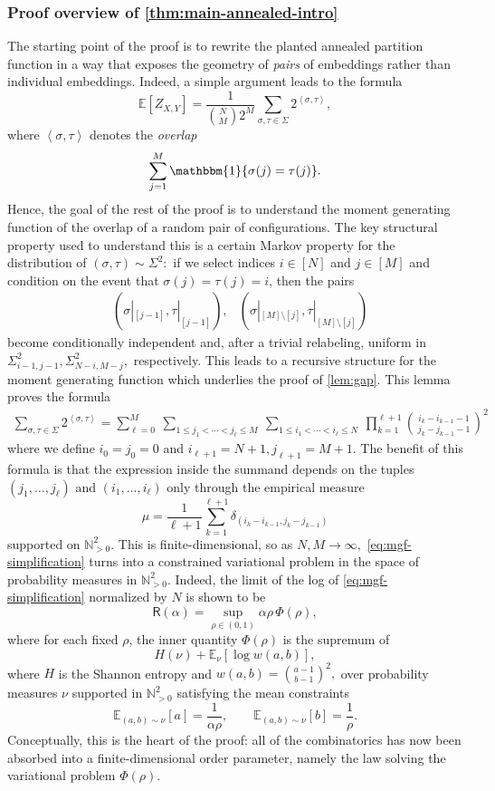 \documentclass[11pt]{amsart}
\numberwithin{equation}{section}
\numberwithin{equation}{section}
\newcommand{\brac}[1]{\left \langle #1 \right \rangle}
\newcommand{\1}{\mathbbm{1}}
\newcommand{\E}{\mathbb{E}}
\newcommand{\N}{\mathbb{N}}
\theoremstyle{definition}
\begin{document}
\subsubsection{Proof overview of \cref{thm:main-annealed-intro}}
The starting point of the proof is to rewrite the planted annealed partition function in a way that exposes the geometry of \emph{pairs} of embeddings rather than individual embeddings. Indeed, a simple argument leads to the formula
\[
\E\left[ Z_{X, Y} \right] = \frac{1}{\binom{N}{M}2^M}\sum_{\sigma,\tau \in\Sigma}  2^{\brac{\sigma,\tau}},
\]
where $\brac{\sigma,\tau}$ denotes the \emph{overlap} 
\begin{align*}
    \sum_{j=1}^M \1\{\sigma(j) = \tau(j)\}.
\end{align*}
Hence, the goal of the rest of the proof is to understand the moment generating function of the overlap of a random pair of configurations. The key structural property used to understand this is a certain Markov property for the distribution of $(\sigma,\tau) \sim \Sigma^2:$ if we select indices $i\in [N]$ and $j\in [M]$ and condition on the event that $\sigma(j) = \tau(j) = i$, then the pairs 
\begin{align*}
    & (\sigma|_{[j-1]},\tau|_{[j-1]}),
    & (\sigma|_{[M]\setminus [j]},\tau|_{[M]\setminus [j]})
\end{align*}
become conditionally independent and, after a trivial relabeling, uniform in $\Sigma_{i-1,j-1}^2,\Sigma_{N-i,M-j}^2,$ respectively. This leads to a recursive structure for the moment generating function which underlies the proof of \cref{lem:gap}. This lemma proves the formula
\begin{align}\label{eq:mgf-simplification}
\sum_{\sigma,\tau \in\Sigma}  2^{\brac{\sigma,\tau}} = \sum_{\ell=0}^{M}\ \sum_{1\le j_1<\cdots<j_\ell\le M}\ \sum_{1\le i_1<\cdots<i_\ell\le N} \ \prod_{k=1}^{\ell+1}\binom{i_k-i_{k-1}-1}{\,j_k-j_{k-1}-1\,}^{\!2}
\end{align}
where we define $i_0=j_0=0$ and $i_{\ell+1}=N+1,j_{\ell+1}=M+1$. The benefit of this formula is that the expression inside the summand depends on the tuples $(j_1,\dots,j_\ell)$ and $(i_1,\dots,i_\ell)$ only through the empirical measure
\[
\mu = \frac{1}{\ell + 1} \sum_{k=1}^{\ell+1} \delta_{(i_k-i_{k-1}, j_k-j_{k-1})}
\]
supported on $\N^2_{>0}.$ This is finite-dimensional, so as $N,M\to\infty,$ \eqref{eq:mgf-simplification} turns into a constrained variational problem in the space of probability measures in $\N^2_{>0}.$ Indeed, the limit of the log of \eqref{eq:mgf-simplification} normalized by $N$ is shown to be 
\[
\mathsf R(\alpha)=\sup_{\rho\in(0,1)} \alpha\rho\,\Phi(\rho),
\]
where for each fixed $\rho$, the inner quantity $\Phi(\rho)$ is the supremum of
\[
H(\nu)+\E_\nu[\log w(a,b)],
\]
where $H$ is the Shannon entropy and $w(a,b) = \binom{a-1}{b-1}^2,$
over probability measures $\nu$ supported in $\N^2_{>0}$ satisfying the mean constraints
\[
\E_{(a,b)\sim \nu}[a]=\frac{1}{\alpha\rho},\qquad \E_{(a,b)\sim \nu}[b]=\frac{1}{\rho}.
\]
Conceptually, this is the heart of the proof: all of the combinatorics has now been absorbed into a finite-dimensional order parameter, namely the law solving the variational problem $\Phi(\rho).$
\end{document}
